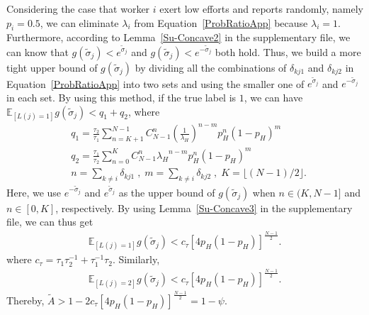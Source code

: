 Considering the case that worker $i$ exert low efforts and reports randomly, namely $p_i=0.5$, we can eliminate $\lambda_i$ from Equation~\ref{ProbRatioApp} because $\lambda_i=1$.
Furthermore, according to Lemma~\ref{Su-Concave2} in the supplementary file, we can know that 
$g(\tilde{\sigma}_j)< e^{\tilde{\sigma}_j}$ and $g(\tilde{\sigma}_j)< e^{-\tilde{\sigma}_j}$ both hold.
Thus, we build a more tight upper bound of $g(\tilde{\sigma}_j)$ by dividing all the combinations of $\delta_{kj1}$ and $\delta_{kj2}$ in Equation~\ref{ProbRatioApp} into two sets and using the smaller one of $e^{\tilde{\sigma}_j}$ and $e^{-\tilde{\sigma}_j}$ in each set.
By using this method, if the true label is $1$, we can have $\mathbb{E}_{[L(j)=1]}g(\tilde{\sigma}_j)< q_1+q_2$, where
\begin{equation*}
\begin{split}
&q_1 = \frac{\tau_2}{\tau_1}{\sum}_{n=K+1}^{N-1}C_{N-1}^{n} (\frac{1}{\lambda_H})^{n-m}p_H^n(1-p_H)^m\\
&q_2 = \frac{\tau_1}{\tau_2}{\sum}_{n=0}^{K}C_{N-1}^{n} {\lambda_H}^{n-m}p_H^n(1-p_H)^m\\
&n={\sum}_{k\neq i}\delta_{kj1}\;,\;m= {\sum}_{k\neq i}\delta_{kj2}\;,\;K=\lfloor (N-1)/2 \rfloor.
\end{split}
\end{equation*}
Here, we use $e^{-\tilde{\sigma}_j}$ and $e^{\tilde{\sigma}_j}$ as the upper bound of $g(\tilde{\sigma}_j)$ when $n\in (K, N-1]$ and $n\in [0, K]$, respectively. By using Lemma~\ref{Su-Concave3} in the supplementary file, we can thus get
\begin{equation}
\begin{split}
\mathbb{E}_{[L(j)=1]}g(\tilde{\sigma}_j) < c_{\tau}[4p_H(1-p_H)]^{\frac{N-1}{2}}.
\end{split}
\end{equation}
where $c_{\tau}=\tau_1\tau_2^{-1}+\tau_1^{-1}\tau_2$. Similarly,
\begin{equation}
\begin{split}
\mathbb{E}_{[L(j)=2]}g(\tilde{\sigma}_j) < c_{\tau}[4p_H(1-p_H)]^{\frac{N-1}{2}}.
\end{split}
\end{equation}
Thereby, $\tilde{A}>1-2c_{\tau}[4p_H(1-p_H)]^{\frac{N-1}{2}}=1-\psi$.


